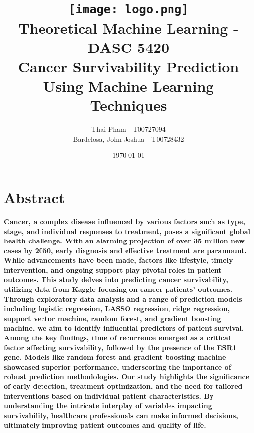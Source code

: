 \documentclass[11pt,singlespace]{article}
\title{\texttt{[image: logo.png]}\\
	Theoretical Machine Learning - DASC 5420\\
	\textbf{Cancer Survivability Prediction 
		\\Using Machine Learning Techniques}}
\author{Thai Pham  - T00727094\\
	Bardelosa, John Joshua - T00728432}
\date{\today}
\begin{document}
	
	\maketitle
	
	
	
	\section*{Abstract}
	\begin{center}
		\textbf{Cancer, a complex disease influenced by various factors such as type, stage, and individual responses to treatment, poses a significant global health challenge. With an alarming projection of over 35 million new cases by 2050, early diagnosis and effective treatment are paramount. While advancements have been made, factors like lifestyle, timely intervention, and ongoing support play pivotal roles in patient outcomes. This study delves into predicting cancer survivability, utilizing data from Kaggle focusing on cancer patients' outcomes. Through exploratory data analysis and a range of prediction models including logistic regression, LASSO regression, ridge regression, support vector machine, random forest, and gradient boosting machine, we aim to identify influential predictors of patient survival.	Among the key findings, time of recurrence emerged as a critical factor affecting survivability, followed by the presence of the ESR1 gene. Models like random forest and gradient boosting machine showcased superior performance, underscoring the importance of robust prediction methodologies. Our study highlights the significance of early detection, treatment optimization, and the need for tailored interventions based on individual patient characteristics. By understanding the intricate interplay of variables impacting survivability, healthcare professionals can make informed decisions, ultimately improving patient outcomes and quality of life.}
	\end{center}
	
	\clearpage
	
\end{document}
